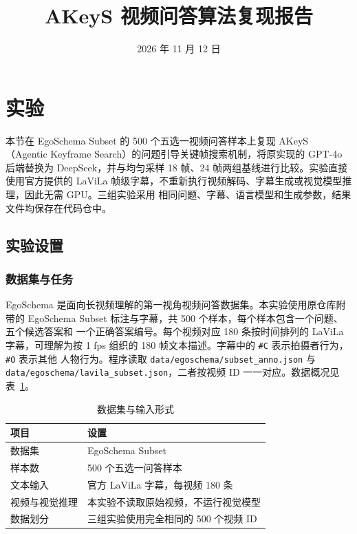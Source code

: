 \documentclass[12pt,UTF8]{ctexart}
\title{AKeyS 视频问答算法复现报告}
\author{}
\date{2026 年 11 月 12 日}
\begin{document}
\maketitle

\section{实验}

本节在 EgoSchema Subset 的 500 个五选一视频问答样本上复现 AKeyS
（Agentic Keyframe Search）的问题引导关键帧搜索机制，将原实现的 GPT-4o 后端替换为
DeepSeek，并与均匀采样 18 帧、24 帧两组基线进行比较。实验直接使用官方提供的 LaViLa
帧级字幕，不重新执行视频解码、字幕生成或视觉模型推理，因此无需 GPU。三组实验采用
相同问题、字幕、语言模型和生成参数，结果文件均保存在代码仓中。

\subsection{实验设置}

\subsubsection{数据集与任务}

EgoSchema 是面向长视频理解的第一视角视频问答数据集。本实验使用原仓库附带的
EgoSchema Subset 标注与字幕，共 500 个样本，每个样本包含一个问题、五个候选答案和
一个正确答案编号。每个视频对应 180 条按时间排列的 LaViLa 字幕，可理解为按 1 fps
组织的 180 帧文本描述。字幕中的 \texttt{\#C} 表示拍摄者行为，\texttt{\#O} 表示其他
人物行为。程序读取 \texttt{data/egoschema/subset\_anno.json} 与
\texttt{data/egoschema/lavila\_subset.json}，二者按视频 ID 一一对应。数据概况见
表~\ref{tab:dataset}。

\begin{table}[htbp]
  \centering\small
  \caption{数据集与输入形式}
  \label{tab:dataset}
  \begin{tabular}{ll}
    \toprule
    项目 & 设置 \\
    \midrule
    数据集 & EgoSchema Subset \\
    样本数 & 500 个五选一问答样本 \\
    文本输入 & 官方 LaViLa 字幕，每视频 180 条 \\
    视频与视觉推理 & 本实验不读取原始视频，不运行视觉模型 \\
    数据划分 & 三组实验使用完全相同的 500 个视频 ID \\
    \bottomrule
  \end{tabular}
\end{table}
\end{document}
